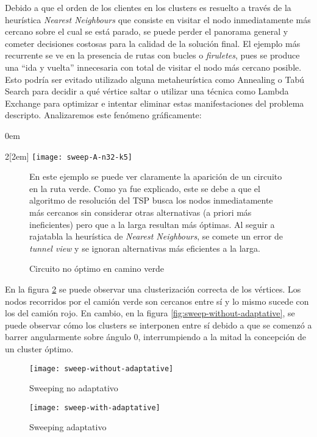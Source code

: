 Debido a que el orden de los clientes en los clusters es resuelto a través de la heurística \textit{Nearest Neighbours} que consiste en visitar el nodo inmediatamente más cercano sobre el cual se está parado, se puede perder el panorama general y cometer decisiones costosas para la calidad de la solución final. El ejemplo más recurrente se ve en la presencia de rutas con bucles o \textit{firuletes}, pues se produce una ``ida y vuelta'' innecesaria con total de visitar el nodo más cercano posible. Esto podría ser evitado utilizado alguna metaheurística como Annealing o Tabú Search para decidir a qué vértice saltar o utilizar una técnica como Lambda Exchange para optimizar e intentar eliminar estas manifestaciones del problema descripto. Analizaremos este fenómeno gráficamente:

\parindent0em
\begin{multicols}{2}[\columnsep2em]
		\texttt{[image: sweep-A-n32-k5]}
\columnbreak
	\begin{figure}[H]
		\caption{Circuito no óptimo en camino verde} \label{fig:sweep-A-n32-k5}
		\vskip 4pt
		En este ejemplo se puede ver claramente la aparición de un circuito en la ruta verde. Como ya fue explicado, este se debe a que el algoritmo de resolución del TSP busca los nodos inmediatamente más cercanos sin considerar otras alternativas (a priori más ineficientes) pero que a la larga resultan más óptimas. Al seguir a rajatabla la heurística de \textit{Nearest Neighbours}, se comete un error de \textit{tunnel view} y se ignoran alternativas más eficientes a la larga.
	\end{figure}
\end{multicols}

En la figura \ref{fig:sweep-with-adaptative} se puede observar una clusterización correcta de los vértices. Los nodos recorridos por el camión verde son cercanos entre sí y lo mismo sucede con los del camión rojo. En cambio, en la figura \ref{fig:sweep-without-adaptative}, se puede observar cómo los clusters se interponen entre sí debido a que se comenzó a barrer angularmente sobre ángulo $0$, interrumpiendo a la mitad la concepción de un cluster óptimo.
\begin{figure}[H]
	\centering
	\begin{minipage}{0.48\textwidth}
		\centering
		\texttt{[image: sweep-without-adaptative]}
		\caption{\footnotesize Sweeping no adaptativo}
		\label{fig:sweep-without-adaptative}
	\end{minipage}%
	\hspace{0.03\textwidth}
	\begin{minipage}{0.48\textwidth}
		\centering
		\texttt{[image: sweep-with-adaptative]}
		\caption{\footnotesize Sweeping adaptativo}
		\label{fig:sweep-with-adaptative}
	\end{minipage}%
\end{figure}

